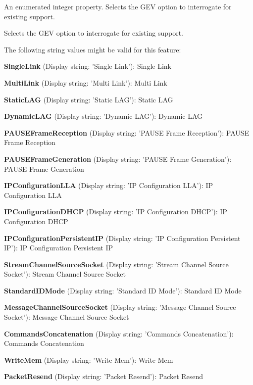 An enumerated integer property. Selects the G\+E\+V option to interrogate for existing support. 

Selects the G\+E\+V option to interrogate for existing support.

The following string values might be valid for this feature\+:
\begin{DoxyItemize}
\item {\bfseries Single\+Link} (Display string\+: 'Single Link')\+: Single Link
\item {\bfseries Multi\+Link} (Display string\+: 'Multi Link')\+: Multi Link
\item {\bfseries Static\+L\+A\+G} (Display string\+: 'Static L\+A\+G')\+: Static L\+A\+G
\item {\bfseries Dynamic\+L\+A\+G} (Display string\+: 'Dynamic L\+A\+G')\+: Dynamic L\+A\+G
\item {\bfseries P\+A\+U\+S\+E\+Frame\+Reception} (Display string\+: 'P\+A\+U\+S\+E Frame Reception')\+: P\+A\+U\+S\+E Frame Reception
\item {\bfseries P\+A\+U\+S\+E\+Frame\+Generation} (Display string\+: 'P\+A\+U\+S\+E Frame Generation')\+: P\+A\+U\+S\+E Frame Generation
\item {\bfseries I\+P\+Configuration\+L\+L\+A} (Display string\+: 'I\+P Configuration L\+L\+A')\+: I\+P Configuration L\+L\+A
\item {\bfseries I\+P\+Configuration\+D\+H\+C\+P} (Display string\+: 'I\+P Configuration D\+H\+C\+P')\+: I\+P Configuration D\+H\+C\+P
\item {\bfseries I\+P\+Configuration\+Persistent\+I\+P} (Display string\+: 'I\+P Configuration Persistent I\+P')\+: I\+P Configuration Persistent I\+P
\item {\bfseries Stream\+Channel\+Source\+Socket} (Display string\+: 'Stream Channel Source Socket')\+: Stream Channel Source Socket
\item {\bfseries Standard\+I\+D\+Mode} (Display string\+: 'Standard I\+D Mode')\+: Standard I\+D Mode
\item {\bfseries Message\+Channel\+Source\+Socket} (Display string\+: 'Message Channel Source Socket')\+: Message Channel Source Socket
\item {\bfseries Commands\+Concatenation} (Display string\+: 'Commands Concatenation')\+: Commands Concatenation
\item {\bfseries Write\+Mem} (Display string\+: 'Write Mem')\+: Write Mem
\item {\bfseries Packet\+Resend} (Display string\+: 'Packet Resend')\+: Packet Resend

\end{DoxyItemize}
